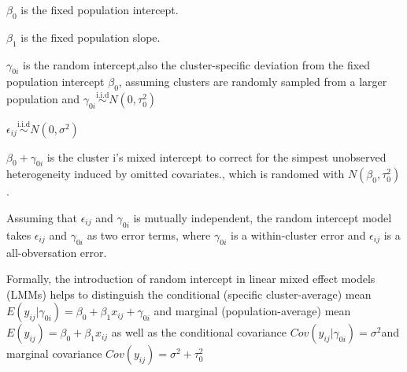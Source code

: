 \documentclass[12pt]{article}
\begin{document}
$\beta_0$ is the fixed population intercept.

$\beta_1$ is the fixed population slope.

$\gamma_{0i}$ is the random intercept,also the cluster-specific deviation from the fixed population intercept $\beta_0$, assuming clusters are randomly
sampled from a larger population and  $\gamma_{0i} \stackrel{\text{i.i.d}}{\sim}  N(0,\tau_0 ^2)$

$\epsilon_{ij}\stackrel{\text{i.i.d}}{\sim} N(0,\sigma^2)$ 

$\beta_0 + \gamma_{0i}$ is the cluster i's mixed intercept to correct for the simpest unobserved heterogeneity induced by omitted covariates., which is randomed with $N (\beta_0,\tau_0 ^2)$.

Assuming that $\epsilon_{ij}$ and $\gamma_{0i}$ is mutually independent, the random intercept model takes $\epsilon_{ij}$ and $\gamma_{0i}$ as  two error terms, where $\gamma_{0i}$ is a within-cluster error and $\epsilon_{ij}$ is a all-obversation error.

Formally, the introduction of random intercept in linear mixed effect models (LMMs) helps to distinguish the conditional (specific cluster-average) mean $E(y_{ij}| \gamma_{0i}) = \beta_0 + \beta_1 x_{ij} + \gamma_{0i}$  and marginal (population-average) mean $ E(y_{ij})= \beta_0 + \beta_1 x_{ij} $ as well as the conditional covariance $Cov(y_{ij}| \gamma_{0i})= \sigma^2 $and marginal covariance $ Cov(y_{ij})= \sigma^2 + \tau_0^2$
\end{document}
